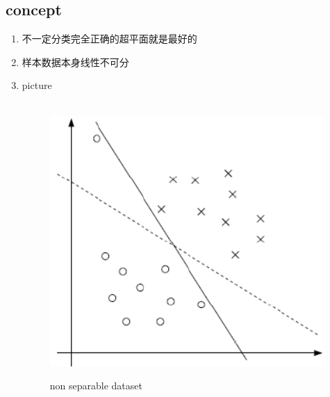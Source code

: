 \documentclass[oneside, 12pt]{ctexbook}
\begin{document}
			\subsection{\quad concept}
				\begin{enumerate}
					\item 不一定分类完全正确的超平面就是最好的
					
					\item 样本数据本身线性不可分
					
					\item picture
						\begin{figure}[H]
							\label{non_separable_dataset}
							\vspace{-0.2cm}  %
							\setlength{\abovecaptionskip}{-0.2cm}   %
							\centering
							\includegraphics[scale=0.7]{non_separable_dataset.png}
							\renewcommand{\figurename}{Fig} %
							\caption{non separable dataset}
						\end{figure}
				\end{enumerate}
			
\end{document}
